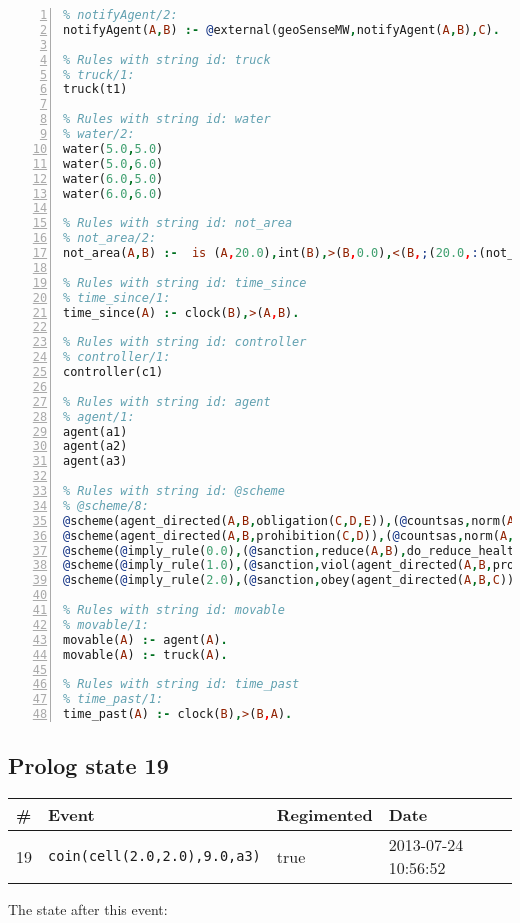 \documentclass[11pt]{article}\usepackage[utf8]{inputenc}\usepackage{geometry}
\begin{document}
\begin{lstlisting}[language=Prolog, numbers=left]
% Rules with string id: notifyAgent
% notifyAgent/2:
notifyAgent(A,B) :- @external(geoSenseMW,notifyAgent(A,B),C).

% Rules with string id: truck
% truck/1:
truck(t1)

% Rules with string id: water
% water/2:
water(5.0,5.0)
water(5.0,6.0)
water(6.0,5.0)
water(6.0,6.0)

% Rules with string id: not_area
% not_area/2:
not_area(A,B) :-  is (A,20.0),int(B),>(B,0.0),<(B,;(20.0,:(not_area(A,B), is (-(B),20.0)))),int(A),>(A,0.0),<(A,;(20.0,:(area(A,B),-(int(A))))),int(B),>(A,0.0),>(B,0.0),<(A,21.0),<(B,21.0).

% Rules with string id: time_since
% time_since/1:
time_since(A) :- clock(B),>(A,B).

% Rules with string id: controller
% controller/1:
controller(c1)

% Rules with string id: agent
% agent/1:
agent(a1)
agent(a2)
agent(a3)

% Rules with string id: @scheme
% @scheme/8:
@scheme(agent_directed(A,B,obligation(C,D,E)),(@countsas,norm(A,B,F,obligation(C,D,E)),F),false,(listTrue(C)),(time_past(D)),false,[plus(viol(agent_directed(A,B,obligation(C,D,E))))|[]],[plus(obey(agent_directed(A,B,obligation(C,D,E))))|[]])
@scheme(agent_directed(A,B,prohibition(C,D)),(@countsas,norm(A,B,E,prohibition(C,D)),E),(listTrue(C)),false,(false),false,[plus(viol(agent_directed(A,B,prohibition(C,D))))|[]],[plus(obey(agent_directed(A,B,prohibition(C,D))))|[]])
@scheme(@imply_rule(0.0),(@sanction,reduce(A,B),do_reduce_health(A,B),notifyAgent(A,changed(status))),true,false,false,false,[min(reduce(A,B))|[]],[])
@scheme(@imply_rule(1.0),(@sanction,viol(agent_directed(A,B,prohibition(C,D))),do_sanction(D)),true,false,false,false,[min(viol(agent_directed(A,B,prohibition(C,D))))|[]],[])
@scheme(@imply_rule(2.0),(@sanction,obey(agent_directed(A,B,C))),true,false,false,false,[min(obey(agent_directed(A,B,C)))|[]],[])

% Rules with string id: movable
% movable/1:
movable(A) :- agent(A).
movable(A) :- truck(A).

% Rules with string id: time_past
% time_past/1:
time_past(A) :- clock(B),>(B,A).

\end{lstlisting}
\clearpage 
\subsection{Prolog state 19}
\begin{table}[ht]
\centering 
\begin{tabular}{l l l l} 
\textbf{\#} & \textbf{Event} & \textbf{Regimented} & \textbf{Date} \\ [0.5ex] 
\hline
19&\texttt{coin(cell(2.0,2.0),9.0,a3)}&true&2013-07-24 10:56:52\\ [1ex] \hline\end{tabular}
\end{table}
The state after this event:
\end{document}
